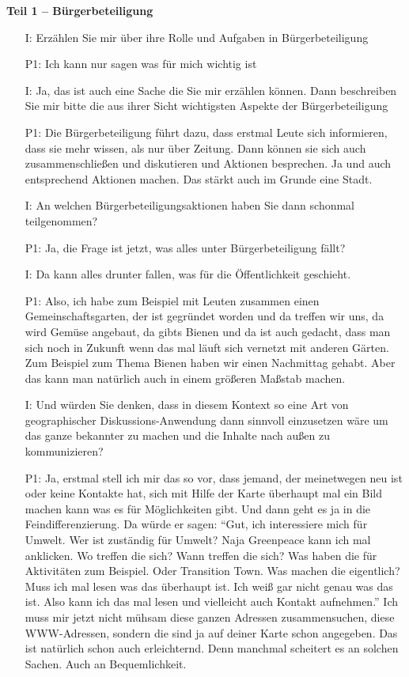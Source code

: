 \textbf{Teil 1 -- B{\"u}rgerbeteiligung}
\begin{itemize}
    \item[I:] Erz{\"a}hlen Sie mir {\"u}ber ihre Rolle und Aufgaben in B{\"u}rgerbeteiligung
    \item[P1:] Ich kann nur sagen was f{\"u}r mich wichtig ist
    \item[I:] Ja, das ist auch eine Sache die Sie mir erz{\"a}hlen k{\"o}nnen. Dann beschreiben Sie mir bitte die aus ihrer Sicht wichtigsten Aspekte der B{\"u}rgerbeteiligung
    \item[P1:] Die B{\"u}rgerbeteiligung f{\"u}hrt dazu, dass erstmal Leute sich informieren, dass sie mehr wissen, als nur {\"u}ber Zeitung. Dann k{\"o}nnen sie sich auch zusammenschlie{\ss}en und diskutieren und Aktionen besprechen. Ja und auch entsprechend Aktionen machen. Das st{\"a}rkt auch im Grunde eine Stadt.
    \item[I:] An welchen B{\"u}rgerbeteiligungsaktionen haben Sie dann schonmal teilgenommen?
	\item[P1:] Ja, die Frage ist jetzt, was alles unter B{\"u}rgerbeteiligung f{\"a}llt?
	\item[I:] Da kann alles drunter fallen, was f{\"u}r die {\"O}ffentlichkeit geschieht.
	\item[P1:] Also, ich habe zum Beispiel mit Leuten zusammen einen Gemeinschaftsgarten, der ist gegr{\"u}ndet worden und da treffen wir uns, da wird Gem{\"u}se angebaut, da gibts Bienen und da ist auch gedacht, dass man sich noch in Zukunft wenn das mal l{\"a}uft sich vernetzt mit anderen G{\"a}rten. Zum Beispiel zum Thema Bienen haben wir einen Nachmittag gehabt. Aber das kann man nat{\"u}rlich auch in einem gr{\"o}{\ss}eren Ma{\ss}stab machen.
	\item[I:] Und w{\"u}rden Sie denken, dass in diesem Kontext so eine Art von geographischer Diskussions-Anwendung dann sinnvoll einzusetzen w{\"a}re um das ganze bekannter zu machen und die Inhalte nach au{\ss}en zu kommunizieren?
	\item[P1:] Ja, erstmal stell ich mir das so vor, dass jemand, der meinetwegen neu ist oder keine Kontakte hat, sich mit Hilfe der Karte {\"u}berhaupt mal ein Bild machen kann was es f{\"u}r M{\"o}glichkeiten gibt. Und dann geht es ja in die Feindifferenzierung. Da w{\"u}rde er sagen: "`Gut, ich interessiere mich f{\"u}r Umwelt. Wer ist zust{\"a}ndig f{\"u}r Umwelt? Naja Greenpeace kann ich mal anklicken. Wo treffen die sich? Wann treffen die sich? Was haben die f{\"u}r Aktivit{\"a}ten zum Beispiel. Oder Transition Town. Was machen die eigentlich? Muss ich mal lesen was das {\"u}berhaupt ist. Ich wei{\ss} gar nicht genau was das ist. Also kann ich das mal lesen und vielleicht auch Kontakt aufnehmen."' Ich muss mir jetzt nicht m{\"u}hsam diese ganzen Adressen zusammensuchen, diese WWW-Adressen, sondern die sind ja auf deiner Karte schon angegeben. Das ist nat{\"u}rlich schon auch erleichternd. Denn manchmal scheitert es an solchen Sachen. Auch an Bequemlichkeit.

\end{itemize}
